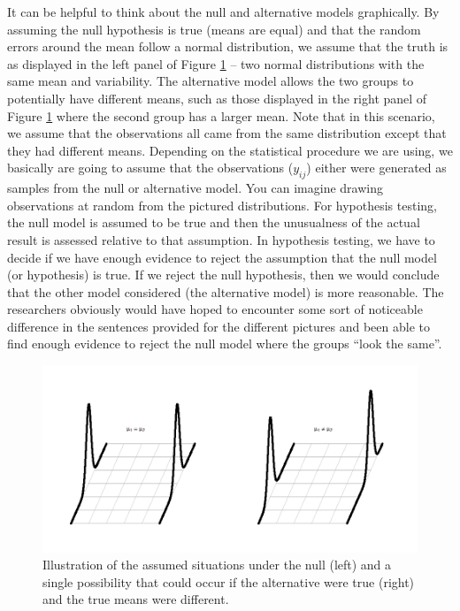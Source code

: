 \documentclass[]{book}
\begin{document}
It can be helpful to think about the null and alternative models
graphically. By assuming the null hypothesis is true (means are equal)
and that the random errors around the mean follow a normal distribution,
we assume that the truth is as displayed in the left panel of Figure
\ref{fig:Figure2-7} -- two normal distributions with the same mean and
variability. The alternative model allows the two groups to potentially
have different means, such as those displayed in the right panel of
Figure \ref{fig:Figure2-7} where the second group has a larger mean.
Note that in this scenario, we assume that the observations all came
from the same distribution except that they had different means.
Depending on the statistical procedure we are using, we basically are
going to assume that the observations (\(y_{ij}\)) either were generated
as samples from the null or alternative model. You can imagine drawing
observations at random from the pictured distributions. For hypothesis
testing, the null model is assumed to be true and then the unusualness
of the actual result is assessed relative to that assumption. In
hypothesis testing, we have to decide if we have enough evidence to
reject the assumption that the null model (or hypothesis) is true. If we
reject the null hypothesis, then we would conclude that the other model
considered (the alternative model) is more reasonable. The researchers
obviously would have hoped to encounter some sort of noticeable
difference in the sentences provided for the different pictures and been
able to find enough evidence to reject the null model where the groups
``look the same''.





\begin{figure}
\includegraphics[width=13.33in]{chapter1_files/image015} \caption{Illustration of the assumed situations under the null
(left) and a single possibility that could occur if the alternative were
true (right) and the true means were different.}\label{fig:Figure2-7}
\end{figure}
\end{document}
